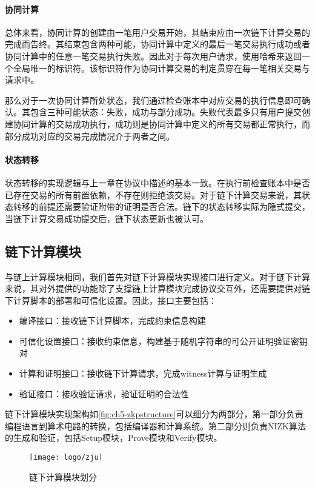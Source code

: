 \paragraph{协同计算} 总体来看，协同计算的创建由一笔用户交易开始，其结束应由一次链下计算交易的完成而告终。其结束包含两种可能，协同计算中定义的最后一笔交易执行成功或者协同计算中的任意一笔交易执行失败。因此对于每次用户请求，使用哈希来返回一个全局唯一的标识符。该标识符作为协同计算交易的判定贯穿在每一笔相关交易与请求中。

那么对于一次协同计算所处状态，我们通过检查账本中对应交易的执行信息即可确认。其包含三种可能状态：失败，成功与部分成功。失败代表最多只有用户提交创建协同计算的交易成功执行，成功则是协同计算中定义的所有交易都正常执行，而部分成功对应的交易完成情况介于两者之间。

\paragraph{状态转移} 状态转移的实现逻辑与上一章在协议中描述的基本一致。在执行前检查账本中是否已存在交易的所有前置依赖，不存在则拒绝该交易。对于链下计算交易来说，其状态转移的前提还需要验证附带的证明是否合法。链下的状态转移实际为隐式提交，当链下计算交易成功提交后，链下状态更新也被认可。

\subsection{链下计算模块}%
与链上计算模块相同，我们首先对链下计算模块实现接口进行定义。对于链下计算来说，其对外提供的功能除了支撑链上计算模块完成协议交互外，还需要提供对链下计算脚本的部署和可信化设置。因此，接口主要包括：
\begin{itemize}
    \setlength{\itemsep}{0pt}
    \setlength{\parsep}{0pt}
    \setlength{\parskip}{0pt}
    \item 编译接口：接收链下计算脚本，完成约束信息构建
    \item 可信化设置接口：接收约束信息，构建基于随机字符串的可公开证明验证密钥对
    \item 计算和证明接口：接收链下计算请求，完成witness计算与证明生成
    \item 验证接口：接收验证请求，验证证明的合法性
\end{itemize}

链下计算模块实现架构如\autoref{fig:ch5-zkpstructure}可以细分为两部分，第一部分负责编程语言到算术电路的转换，包括编译器和计算系统。第二部分则负责NIZK算法的生成和验证，包括Setup模块，Prove模块和Verify模块。
\begin{figure}[htbp]
    \centering
    \texttt{[image: logo/zju]}
    \caption{\label{fig:ch5-zkpstructure}链下计算模块划分}
\end{figure}

